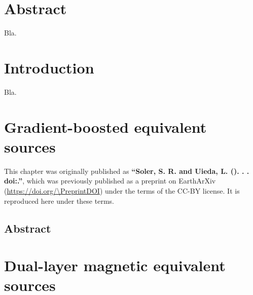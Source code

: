 \documentclass[10pt,a4paper,oneside]{book}
\begin{document}
\chapter*{Abstract}

Bla.

\tableofcontents

\mainmatter
\pagestyle{fancy}

\chapter{Introduction}

Bla.

\chapter{Gradient-boosted equivalent sources}

\begingroup


\begin{summarybox}
    \noindent
    This chapter was originally published as
    \textbf{``Soler, S. R. and Uieda, L. (\Year). \Title{}. \textit{\Journal{}}.
    doi:\href{https://doi.org/\DOI}{\DOI}.''}, which was previously published
    as a preprint on EarthArXiv (\url{https://doi.org/\PreprintDOI}) under the
    terms of the CC-BY license. It is reproduced here under these terms.
\end{summarybox}

\section*{Abstract}


% 
\endgroup

\chapter{Dual-layer magnetic equivalent sources}

\begingroup

\end{document}
